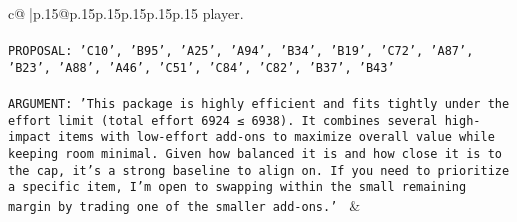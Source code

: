 \documentclass{article}
\begin{document}
{\begin{supertabular}{c@{$\;$}|p{.15\linewidth}@{}p{.15\linewidth}p{.15\linewidth}p{.15\linewidth}p{.15\linewidth}p{.15\linewidth}}
{{{player.\\ \tt \\ \tt PROPOSAL: {'C10', 'B95', 'A25', 'A94', 'B34', 'B19', 'C72', 'A87', 'B23', 'A88', 'A46', 'C51', 'C84', 'C82', 'B37', 'B43'}\\ \tt \\ \tt ARGUMENT: {'This package is highly efficient and fits tightly under the effort limit (total effort 6924 ≤ 6938). It combines several high-impact items with low-effort add-ons to maximize overall value while keeping room minimal. Given how balanced it is and how close it is to the cap, it’s a strong baseline to align on. If you need to prioritize a specific item, I’m open to swapping within the small remaining margin by trading one of the smaller add-ons.'} 
	  } 
	   } 
	   } 
	 & \\ 
 

    \theutterance {}  


\end{supertabular}}
\end{document}
